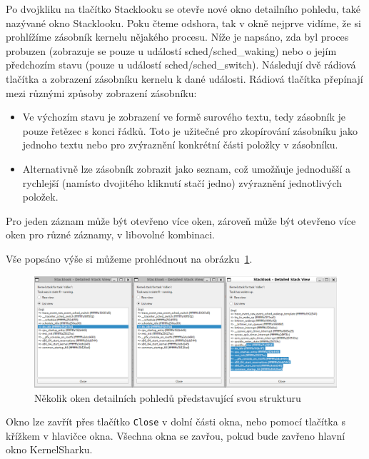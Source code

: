 Po dvojkliku na tlačítko Stacklooku se otevře nové okno detailního pohledu, také nazývané okno Stacklooku. Poku čteme odshora, tak v okně nejprve vidíme, že si prohlížíme zásobník kernelu nějakého procesu. Níže je napsáno, zda byl proces probuzen (zobrazuje se pouze u událostí sched/sched\_waking) nebo o jejím předchozím stavu (pouze u událostí sched/sched\_switch). Následují dvě rádiová tlačítka a zobrazení zásobníku kernelu k dané události. Rádiová tlačítka přepínají mezi různými způsoby zobrazení zásobníku:
\begin{itemize}
  \item Ve výchozím stavu je zobrazení ve formě surového textu, tedy zásobník je pouze řetězec s konci řádků. Toto je užitečné pro zkopírování zásobníku jako jednoho textu nebo pro zvýraznění konkrétní části položky v zásobníku.
  \item Alternativně lze zásobník zobrazit jako seznam, což umožňuje jednodušší a rychlejší (namísto dvojitého kliknutí stačí jedno) zvýraznění jednotlivých položek.
\end{itemize}

Pro jeden záznam může být otevřeno více oken, zároveň může být otevřeno více oken pro různé záznamy, v libovolné kombinaci.

Vše popsáno výše si můžeme prohlédnout na obrázku~\ref{SlMultipleWindowsMultipleViewsTwoSameEntires}.

\begin{figure}[p]\centering
    \includegraphics[width=140mm]{img/Stacklook/SlMultipleWindowsMultipleViewsTwoSameEntires}
    \caption{Několik oken detailních pohledů představující svou strukturu}
    \label{SlMultipleWindowsMultipleViewsTwoSameEntires}
\end{figure}

Okno lze zavřít přes tlačítko \texttt{Close} v dolní části okna, nebo pomocí tlačítka s křížkem v hlavičce okna. Všechna okna se zavřou, pokud bude zavřeno hlavní okno KernelSharku.

